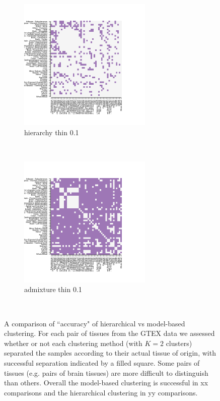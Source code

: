   \begin{figure}[ht]
    \centering
    \begin{subfigure}[t]{0.5\textwidth}
        \centering
        \includegraphics[height=2.5in]{../plots/hierarchy_F_thin_0_1.png}
        \caption{hierarchy thin 0.1}
    \end{subfigure}%
    ~ 
    \begin{subfigure}[t]{0.5\textwidth}
        \centering
        \includegraphics[height=2.5in]{../plots/admixture_F_thin_0_1.png}
        \caption{admixture thin 0.1}
    \end{subfigure} \\
\caption{A comparison of ``accuracy" of hierarchical vs model-based clustering. For each pair of tissues from the GTEX data we assessed whether or not each clustering method (with $K=2$ clusters) separated the samples according to their actual tissue of origin, with successful separation indicated by a filled square. Some pairs of tissues (e.g. pairs of brain tissues) are more difficult to distinguish than others. Overall the model-based clustering is successful in xx comparisons and the hierarchical clustering in yy comparisons.}
\label{fig:fig2}
\end{figure}


